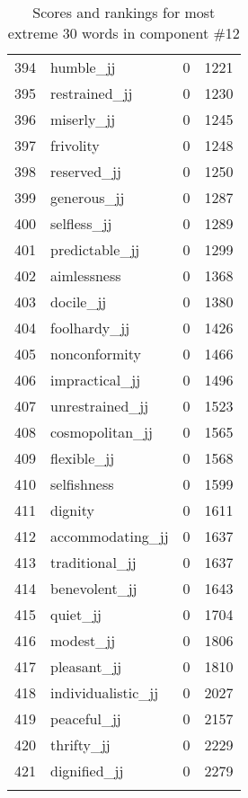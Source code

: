 \begin{longtable}[!htbp]{| rlr@{.}l |}
    394 & humble\_jj & 0 & 1221 \\
    395 & restrained\_jj & 0 & 1230 \\
    396 & miserly\_jj & 0 & 1245 \\
    397 & frivolity & 0 & 1248 \\
    398 & reserved\_jj & 0 & 1250 \\
    399 & generous\_jj & 0 & 1287 \\
    400 & selfless\_jj & 0 & 1289 \\
    401 & predictable\_jj & 0 & 1299 \\
    402 & aimlessness & 0 & 1368 \\
    403 & docile\_jj & 0 & 1380 \\
    404 & foolhardy\_jj & 0 & 1426 \\
    405 & nonconformity & 0 & 1466 \\
    406 & impractical\_jj & 0 & 1496 \\
    407 & unrestrained\_jj & 0 & 1523 \\
    408 & cosmopolitan\_jj & 0 & 1565 \\
    409 & flexible\_jj & 0 & 1568 \\
    410 & selfishness & 0 & 1599 \\
    411 & dignity & 0 & 1611 \\
    412 & accommodating\_jj & 0 & 1637 \\
    413 & traditional\_jj & 0 & 1637 \\
    414 & benevolent\_jj & 0 & 1643 \\
    415 & quiet\_jj & 0 & 1704 \\
    416 & modest\_jj & 0 & 1806 \\
    417 & pleasant\_jj & 0 & 1810 \\
    418 & individualistic\_jj & 0 & 2027 \\
    419 & peaceful\_jj & 0 & 2157 \\
    420 & thrifty\_jj & 0 & 2229 \\
    421 & dignified\_jj & 0 & 2279 \\
    \hline
    \caption{Scores and rankings for most extreme 30 words in component \#12} \\
\end{longtable}

